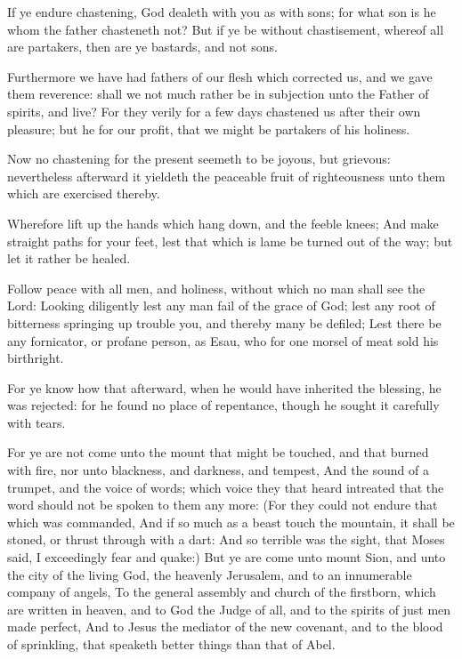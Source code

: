 \verse If ye endure chastening, God dealeth with you as with sons; for what son is he whom the father chasteneth not?  \verse But if ye be without chastisement, whereof all are partakers, then are ye bastards, and not sons.

\verse Furthermore we have had fathers of our flesh which corrected us, and we gave them reverence: shall we not much rather be in subjection unto the Father of spirits, and live?  \verse For they verily for a few days chastened us after their own pleasure; but he for our profit, that we might be partakers of his holiness.

\verse Now no chastening for the present seemeth to be joyous, but grievous: nevertheless afterward it yieldeth the peaceable fruit of righteousness unto them which are exercised thereby.

\verse Wherefore lift up the hands which hang down, and the feeble knees; \verse And make straight paths for your feet, lest that which is lame be turned out of the way; but let it rather be healed.

\verse Follow peace with all men, and holiness, without which no man shall see the Lord: \verse Looking diligently lest any man fail of the grace of God; lest any root of bitterness springing up trouble you, and thereby many be defiled; \verse Lest there be any fornicator, or profane person, as Esau, who for one morsel of meat sold his birthright.

\verse For ye know how that afterward, when he would have inherited the blessing, he was rejected: for he found no place of repentance, though he sought it carefully with tears.

\verse For ye are not come unto the mount that might be touched, and that burned with fire, nor unto blackness, and darkness, and tempest, \verse And the sound of a trumpet, and the voice of words; which voice they that heard intreated that the word should not be spoken to them any more: \verse (For they could not endure that which was commanded, And if so much as a beast touch the mountain, it shall be stoned, or thrust through with a dart: \verse And so terrible was the sight, that Moses said, I exceedingly fear and quake:) \verse But ye are come unto mount Sion, and unto the city of the living God, the heavenly Jerusalem, and to an innumerable company of angels, \verse To the general assembly and church of the firstborn, which are written in heaven, and to God the Judge of all, and to the spirits of just men made perfect, \verse And to Jesus the mediator of the new covenant, and to the blood of sprinkling, that speaketh better things than that of Abel.

